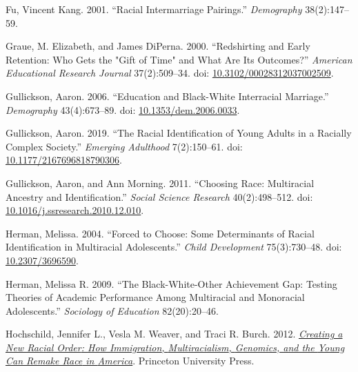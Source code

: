 \documentclass[
  letterpaper,
  DIV=11,
  numbers=noendperiod]{scrartcl}
\newlength{\cslhangindent}
\newlength{\cslentryspacingunit} %
\newenvironment{CSLReferences}[2] %
 {%
  \setlength{\parindent}{0pt}
  \ifodd #1
  \let\oldpar\par
  \def\par{\hangindent=\cslhangindent\oldpar}
  \fi
  \setlength{\parskip}{#2\cslentryspacingunit}
 }%
 {}
\begin{document}
\begin{CSLReferences}{1}{0}
\leavevmode{}%
Fu, Vincent Kang. 2001. {``Racial {Intermarriage Pairings}.''}
\emph{Demography} 38(2):147--59.

\leavevmode{}%
Graue, M. Elizabeth, and James DiPerna. 2000. {``Redshirting and {Early
Retention}: {Who Gets} the "{Gift} of {Time}" and {What Are} {Its
Outcomes}?''} \emph{American Educational Research Journal}
37(2):509--34. doi:
\href{https://doi.org/10.3102/00028312037002509}{10.3102/00028312037002509}.

\leavevmode{}%
Gullickson, Aaron. 2006. {``Education and Black-White Interracial
Marriage.''} \emph{Demography} 43(4):673--89. doi:
\href{https://doi.org/10.1353/dem.2006.0033}{10.1353/dem.2006.0033}.

\leavevmode{}%
Gullickson, Aaron. 2019. {``The {Racial Identification} of {Young
Adults} in a {Racially Complex Society}.''} \emph{Emerging Adulthood}
7(2):150--61. doi:
\href{https://doi.org/10.1177/2167696818790306}{10.1177/2167696818790306}.

\leavevmode{}%
Gullickson, Aaron, and Ann Morning. 2011. {``Choosing Race:
{Multiracial} Ancestry and Identification.''} \emph{Social Science
Research} 40(2):498--512. doi:
\href{https://doi.org/10.1016/j.ssresearch.2010.12.010}{10.1016/j.ssresearch.2010.12.010}.

\leavevmode{}%
Herman, Melissa. 2004. {``Forced to {Choose}: {Some Determinants} of
{Racial Identification} in {Multiracial Adolescents}.''} \emph{Child
Development} 75(3):730--48. doi:
\href{https://doi.org/10.2307/3696590}{10.2307/3696590}.

\leavevmode{}%
Herman, Melissa R. 2009. {``The {Black-White-Other Achievement Gap}:
{Testing Theories} of {Academic Performance Among Multiracial} and
{Monoracial Adolescents}.''} \emph{Sociology of Education}
82(20):20--46.

\leavevmode{}%
Hochschild, Jennifer L., Vesla M. Weaver, and Traci R. Burch. 2012.
\emph{\href{https://books.google.com?id=BeTeF3iWG9sC}{Creating a {New
Racial Order}: {How Immigration}, {Multiracialism}, {Genomics}, and the
{Young Can Remake Race} in {America}}}. {Princeton University Press}.


\end{CSLReferences}
\end{document}
